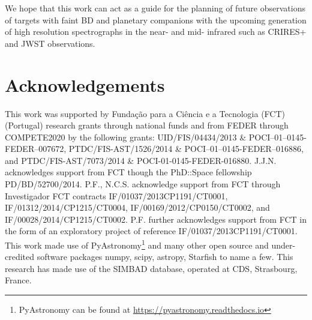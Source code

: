 \documentclass[fleqn,usenatbib]{mnras}
\begin{document}
We hope that this work can act as a guide for the planning of future observations of targets with faint BD and planetary companions with the upcoming generation of high resolution spectrographs in the near- and mid- infrared such as CRIRES+ and JWST observations.


\section*{Acknowledgements}

This work was supported by Funda\c{c}\~ao para a Ci\^encia e a Tecnologia (FCT) (Portugal) research grants through national funds and from FEDER through COMPETE2020 by the following grants: UID/FIS/04434/2013 \& POCI--01--0145-FEDER--007672, PTDC/FIS-AST/1526/2014 \& POCI--01--0145-FEDER--016886, and PTDC/FIS-AST/7073/2014 \& POCI-01-0145-FEDER-016880.
J.J.N. acknowledges support from FCT though the PhD::Space fellowship PD/BD/52700/2014.
P.F., N.C.S. acknowledge support from FCT through Investigador FCT contracts IF/01037/2013CP1191/CT0001, IF/01312/2014/CP1215/CT0004, IF/00169/2012/CP0150/CT0002, and IF/00028/2014/CP1215/CT0002. P.F. further acknowledges support from FCT in the form of an exploratory project of reference IF/01037/2013CP1191/CT0001.
This work made use of PyAstronomy\footnote{PyAstronomy can be found at \url{https://pyastronomy.readthedocs.io}} and many other open source and under-credited software packages numpy, scipy, astropy, Starfish to name a few.
This research has made use of the SIMBAD database, operated at CDS, Strasbourg, France.









\appendix

    
\end{document}
